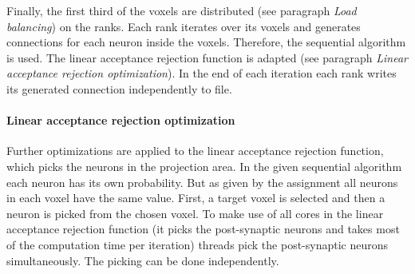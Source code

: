 Finally, the first third of the voxels are distributed (see paragraph \emph{Load balancing}) on the ranks.
Each rank iterates over its voxels and generates connections for each neuron inside the voxels.
Therefore, the sequential algorithm is used.
The linear acceptance rejection function is adapted (see paragraph \emph{Linear acceptance rejection optimization}).
In the end of each iteration each rank writes its generated connection independently to file.

\paragraph{Linear acceptance rejection optimization}
\label{par:linearacceptancerejection}
Further optimizations are applied to the linear acceptance rejection function,
which picks the neurons in the projection area.
In the given sequential algorithm each neuron has its own probability.
But as given by the assignment all neurons in each voxel have the same value.
First, a target voxel is selected and then a neuron is picked from the chosen voxel.
To make use of all cores in the linear acceptance rejection function
(it picks the post-synaptic neurons and takes most of the computation time per iteration)
threads pick the post-synaptic neurons simultaneously.
The picking can be done independently.


